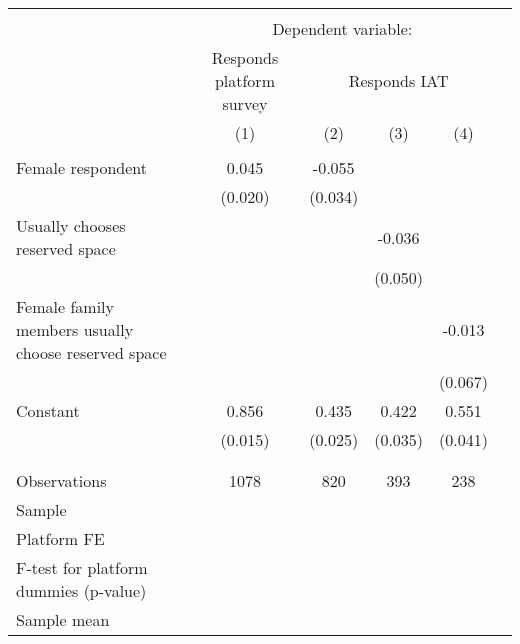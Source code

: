 \begin{tabular}{l*{5}{c}} \hline\hline \\[-1.8ex] & \multicolumn{4}{c}{Dependent variable:} \\ & \multicolumn{1}{c}{Responds platform survey} & \multicolumn{3}{c}{Responds IAT} \\ \cmidrule(lr){2-2}\cmidrule(lr){3-5}
                    &\multicolumn{1}{c}{(1)}&\multicolumn{1}{c}{(2)}&\multicolumn{1}{c}{(3)}&\multicolumn{1}{c}{(4)}\\
\hline \\[-1.8ex]
Female respondent   &       0.045&      -0.055&            &            \\
                    &     (0.020)&     (0.034)&            &            \\
[1em]
Usually chooses reserved space&            &            &      -0.036&            \\
                    &            &            &     (0.050)&            \\
[1em]
Female family members usually choose reserved space&            &            &            &      -0.013\\
                    &            &            &            &     (0.067)\\
[1em]
Constant            &       0.856&       0.435&       0.422&       0.551\\
                    &     (0.015)&     (0.025)&     (0.035)&     (0.041)\\
\\[-1.8ex] \hline \\[-1.8ex]
Observations        &        1078&         820&         393&         238\\
Sample              &            &            &            &            \\
Platform FE         &            &            &            &            \\
F-test for platform dummies (p-value)&            &            &            &            \\
Sample mean         &            &            &            &            \\
\hline\hline \end{tabular}
